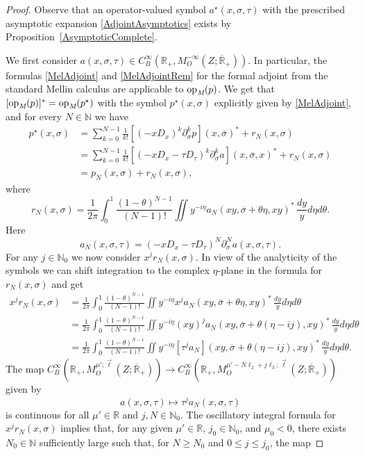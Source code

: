 \documentclass[reqno]{amsart}
\numberwithin{equation}{section}
\theoremstyle{definition}
\def\N{\mathbb N}
\def\R{\mathbb R}
\def\opm{\textup{op}_{\textit{M}}}
\begin{document}
\begin{proof}
Observe that an operator-valued symbol $a^{\star}(x,\sigma,\tau)$ with the prescribed asymptotic expansion \eqref{AdjointAsymptotics} exists by Proposition~\ref{AsymptoticComplete}.

We first consider $a(x,\sigma,\tau) \in C^{\infty}_B(\R_+,M^{-\infty}_O(Z;\overline{\R}_+))$. In particular, the formulas \eqref{MelAdjoint} and \eqref{MelAdjointRem} for the formal adjoint from the standard Mellin calculus are applicable to $\opm(p)$. We get that $[\opm(p)]^* = \opm(p^{\star})$ with the symbol $p^{\star}(x,\sigma)$ explicitly given by \eqref{MelAdjoint}, and for every $N \in \N$ we have
\begin{align*}
p^{\star}(x,\sigma) &= \sum\limits_{k=0}^{N-1}\frac{1}{k!}[(-xD_x)^k\partial_{\sigma}^k p](x,\overline{\sigma})^*+ r_N(x,\sigma) \\
&= \sum\limits_{k=0}^{N-1}\frac{1}{k!}[(-xD_x - \tau D_{\tau})^k\partial_{\sigma}^k a](x,\overline{\sigma},x)^* + r_N(x,\sigma) \\
&= p_N(x,\sigma) + r_N(x,\sigma),
\end{align*}
where
$$
r_N(x,\sigma) = \frac{1}{2\pi}\!\int_0^1\frac{(1-\theta)^{N-1}}{(N-1)!}\iint y^{-i\eta}a_N(xy,\overline{\sigma}+\theta\eta,xy)^*\,\frac{dy}{y}d\eta d\theta.
$$
Here
$$
a_N(x,\sigma,\tau) = (-xD_x - \tau D_{\tau})^{N}\partial_{\sigma}^Na(x,\sigma,\tau).
$$
For any $j \in \N_0$ we  now consider $x^jr_N(x,\sigma)$. In view of the analyticity of the symbols we can shift integration to the complex $\eta$-plane in the formula for $r_N(x,\sigma)$ and get
\begin{align*}
x^jr_N(x,\sigma) &= \frac{1}{2\pi}\!\int_0^1\frac{(1-\theta)^{N-1}}{(N-1)!}\iint y^{-i\eta}x^ja_N(xy,\overline{\sigma}+\theta\eta,xy)^*\,\frac{dy}{y}d\eta d\theta \\
&= \frac{1}{2\pi}\!\int_0^1\frac{(1-\theta)^{N-1}}{(N-1)!}\iint y^{-i\eta}(xy)^ja_N(xy,\overline{\sigma}+\theta(\eta-ij),xy)^*\,\frac{dy}{y}d\eta d\theta \\
&= \frac{1}{2\pi}\!\int_0^1\frac{(1-\theta)^{N-1}}{(N-1)!}\iint y^{-i\eta}[\tau^ja_N](xy,\overline{\sigma}+\theta(\eta-ij),xy)^*\,\frac{dy}{y}d\eta d\theta.
\end{align*}
The map $C^{\infty}_B(\R_+,M^{\mu';\vec{\ell}}_O(Z;\overline{\R}_+)) \to C^{\infty}_B(\R_+,M^{\mu'-N\ell_2 + j\ell_3;\vec{\ell}}_O(Z;\overline{\R}_+))$ given by
$$
a(x,\sigma,\tau) \mapsto \tau^ja_N(x,\sigma,\tau)
$$
is continuous for all $\mu' \in \R$ and $j,N \in \N_0$. The oscillatory integral formula for $x^jr_N(x,\sigma)$ implies that, for any given $\mu' \in \R$, $j_0 \in \N_0$, and $\mu_0 < 0$, there exists $N_0 \in \N$ sufficiently large such that, for $N \geq N_0$ and $0 \leq j \leq j_0$, the map

\end{proof}
\end{document}
